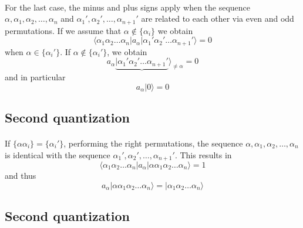 \documentclass[%
twoside,                 %
final,                   %
10pt]{article}
\begin{document}
\paragraph{}
For the last case, the minus and plus signs apply when the sequence 
$\alpha ,\alpha_1, \alpha_2, \dots, \alpha_n$ and 
$\alpha_1', \alpha_2', \dots, \alpha_{n+1}'$ are related to each other via even and odd permutations.
If we assume that  $\alpha \notin \{\alpha_i\}$ we obtain 
\begin{equation}
	\langle\alpha_1\alpha_2 \dots \alpha_n|a_\alpha|\alpha_1'\alpha_2' \dots \alpha_{n+1}'\rangle = 0 \label{eq:2-12}
\end{equation}
when $\alpha \in \{\alpha_i'\}$. If $\alpha \notin \{\alpha_i'\}$, we obtain
\begin{equation}
	a_\alpha\underbrace{|\alpha_1'\alpha_2' \dots \alpha_{n+1}'}\rangle_{\neq \alpha} = 0 \label{eq:2-13a}
\end{equation}
and in particular
\begin{equation}
	a_\alpha |0\rangle = 0 \label{eq:2-13b}
\end{equation}




\subsection*{Second quantization}

\paragraph{}
If $\{\alpha\alpha_i\} = \{\alpha_i'\}$, performing the right permutations, the sequence
$\alpha ,\alpha_1, \alpha_2, \dots, \alpha_n$ is identical with the sequence
$\alpha_1', \alpha_2', \dots, \alpha_{n+1}'$. This results in
\begin{equation}
	\langle\alpha_1\alpha_2 \dots \alpha_n|a_\alpha|\alpha\alpha_1\alpha_2 \dots \alpha_{n}\rangle = 1 \label{eq:2-14}
\end{equation}
and thus
\begin{equation}
	a_\alpha |\alpha\alpha_1\alpha_2 \dots \alpha_{n}\rangle = |\alpha_1\alpha_2 \dots \alpha_{n}\rangle \label{eq:2-15}
\end{equation}




\subsection*{Second quantization}
\end{document}
